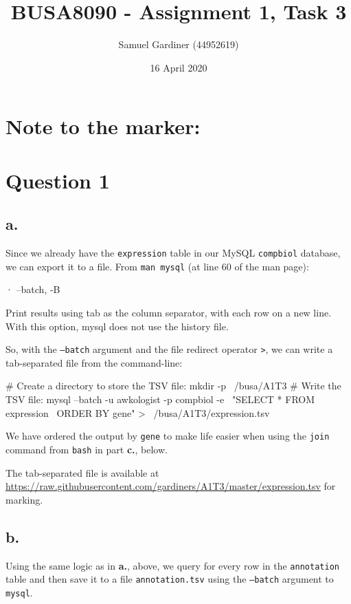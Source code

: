 \documentclass{article}
\title{BUSA8090 - Assignment 1, Task 3}
\author{Samuel Gardiner (44952619)}
\date{16 April 2020}
\begin{document}
\maketitle

\section{Note to the marker:}

\section{Question 1}

\subsection{a.}

Since we already have the \texttt{expression} table in our MySQL \texttt{compbiol} database, we can export it to a file. From \texttt{man mysql} (at line 60 of the man page):

\begin{bashinline}
   ·   --batch, -B

           Print results using tab as the column separator, with each row on a new line. With this option, mysql does not use the history file.
\end{bashinline}

So, with the \texttt{--batch} argument and the file redirect operator \texttt{>}, we can write a tab-separated file from the command-line:

\begin{bashcode}
# Create a directory to store the TSV file:
mkdir -p ~/busa/A1T3
# Write the TSV file:
mysql --batch -u awkologist -p compbiol -e \
"SELECT * FROM expression \
ORDER BY gene" > ~/busa/A1T3/expression.tsv
\end{bashcode}

We have ordered the output by \texttt{gene} to make life easier when using the \texttt{join} command from \texttt{bash} in part \textbf{c.}, below.

The tab-separated file is available at \url{https://raw.githubusercontent.com/gardiners/A1T3/master/expression.tsv} for marking.

\subsection{b.}

Using the same logic as in \textbf{a.}, above, we query for every row in the \texttt{annotation} table and then save it to a file \texttt{annotation.tsv} using the \texttt{--batch} argument to \texttt{mysql}.
\end{document}
